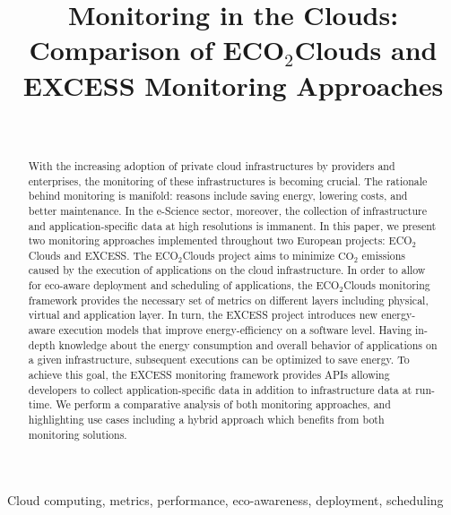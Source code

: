 \documentclass[10pt,letterpaper]{IEEEtran}
\begin{document}
\title{Monitoring in the Clouds: Comparison of ECO$_2$Clouds and EXCESS Monitoring Approaches}

\author{ \\
}

\maketitle

\newcommand{\ECO}{ECO$_2$Clouds\xspace}
\newcommand{\EXCESS}{EXCESS\xspace}

\begin{abstract}
With the increasing adoption of private cloud infrastructures by providers and enterprises, the monitoring of
these infrastructures is becoming crucial. The rationale behind monitoring is manifold: reasons include saving energy,
lowering costs, and better maintenance. In the e-Science sector, moreover, the collection of infrastructure and
application-specific data at high resolutions is immanent. In this paper, we present two monitoring approaches
implemented throughout two European projects: \ECO and \EXCESS. The \ECO project aims to minimize $\mathrm{CO_2}$
emissions caused by the execution of applications on the cloud infrastructure. In order to allow for eco-aware
deployment and scheduling of applications,
the \ECO monitoring framework provides the necessary set of metrics on different layers including physical,
virtual and application layer. In turn, the \EXCESS project introduces new energy-aware execution models
that improve energy-efficiency on a software level. Having in-depth knowledge
about the energy consumption and overall behavior of applications on a given infrastructure, subsequent executions
can be optimized to save energy. To achieve this goal, the \EXCESS monitoring framework provides APIs allowing
developers to collect application-specific data in addition to infrastructure data at run-time.
We perform a comparative analysis of both monitoring approaches, and highlighting use cases including
a hybrid approach which benefits from both monitoring solutions.
\end{abstract}

\begin{IEEEkeywords}
Cloud computing, metrics, performance, eco-awareness, deployment, scheduling
\end{IEEEkeywords}
\end{document}
